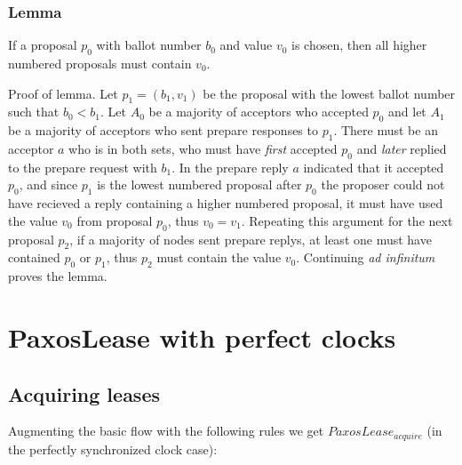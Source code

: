 \documentclass[12pt]{article}
\begin{document}
\subsubsection{ Lemma } If a proposal $p_0$ with ballot number $b_0$ and value $v_0$ is chosen, then all higher numbered proposals must contain $v_0$.

Proof of lemma. Let $p_1 = (b_1, v_1)$ be the proposal with the lowest ballot number such that $b_0 < b_1$. Let $A_0$ be a majority of acceptors who accepted $p_0$ and let $A_1$ be a majority of acceptors who sent prepare responses to $p_1$. There must be an acceptor $a$ who is in both sets, who must have \emph{first} accepted $p_0$ and \emph{later} replied to the prepare request with $b_1$. In the prepare reply $a$ indicated that it accepted $p_0$, and since $p_1$ is the lowest numbered proposal after $p_0$ the proposer could not have recieved a reply containing a higher numbered proposal, it must have used the value $v_0$ from proposal $p_0$, thus $v_0 = v_1$. Repeating this argument for the next proposal $p_2$, if a majority of nodes sent prepare replys, at least one must have contained $p_0$ or $p_1$, thus $p_2$ must contain the value $v_0$. Continuing \emph{ad infinitum} proves the lemma.

\section{ PaxosLease with perfect clocks}

\subsection{ Acquiring leases }

Augmenting the basic flow with the following rules we get $PaxosLease_{acquire}$ (in the perfectly synchronized clock case):
\end{document}
